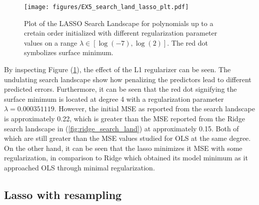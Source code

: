 \documentclass[11pt, a4paper]{article}
\begin{document}
\begin{figure}
  \centering
  \hspace*{-3.5cm}
  \texttt{[image: figures/EX5\_search\_land\_lasso\_plt.pdf]}
  \caption{\label{fig:lasso_search_land}Plot of the LASSO Search Landscape for polynomials up to a cretain order initialized with different regularization parameter values on a range $\lambda \in \left[\log{(-7)}, \log{(2)} \right]$. The red dot symbolizes surface minimum.}
\end{figure}

By inspecting Figure (\ref{fig:lasso_search_land}), the effect of the L1 regularizer can be seen. The undulating search landscape show how penalizing the predictors lead to different predicted errors. Furthermore, it can be seen that the red dot signifying the surface minimum is located at degree 4 with a regularization parameter $\lambda = 0.000351119$. However, the initial MSE as reported from the search landscape is approximately 0.22, which is greater than the MSE reported from the Ridge search landscape in (\ref{fig:ridge_search_land}) at approximately 0.15. Both of which are still greater than the MSE values studied for OLS at the same degree. On the other hand, it can be seen that the lasso minimizes it MSE with some regularization, in comparison to Ridge which obtained its model minimum as it approached OLS through minimal regularization.

\subsection*{Lasso with resampling}
\end{document}
